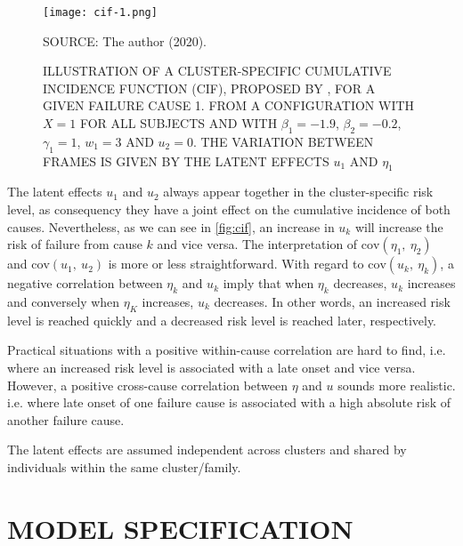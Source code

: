 \begin{figure}[H]
  \setlength{\abovecaptionskip}{.0001pt}
  \caption{ILLUSTRATION OF A CLUSTER-SPECIFIC CUMULATIVE INCIDENCE
    FUNCTION (CIF), PROPOSED BY , FOR A GIVEN
    FAILURE CAUSE 1. FROM A CONFIGURATION WITH \(X = 1\) FOR ALL
    SUBJECTS AND WITH \(\beta_{1} = -1.9\), \(\beta_{2} = -0.2\),
    \(\gamma_{1} = 1\), \(w_{1} = 3\) AND \(u_{2} = 0\). THE VARIATION
    BETWEEN FRAMES IS GIVEN BY THE LATENT EFFECTS \(u_{1}\) AND
    \(\eta_{1}\)}
  \vspace{0.425cm} \centering
  \texttt{[image: cif-1.png]}
  \\
  \vspace{0.45cm}
  \begin{footnotesize}
    SOURCE: The author (2020).
  \end{footnotesize}
  \label{fig:cif}
\end{figure}

The latent effects \(u_{1}\) and \(u_{2}\) always appear together in the
cluster-specific risk level, as consequency they have a joint effect on
the cumulative incidence of both causes. Nevertheless, as we can see in
\autoref{fig:cif}, an increase in \(u_{k}\) will increase the risk of
failure from cause \(k\) and vice versa. The interpretation of
\(\text{cov}(\eta_{1},~\eta_{2})\) and \(\text{cov}(u_{1},~u_{2})\) is
more or less straightforward. With regard to
\(\text{cov}(u_{k},~\eta_{k})\), a negative correlation between
\(\eta_{k}\) and \(u_{k}\) imply that when \(\eta_{k}\) decreases,
\(u_{k}\) increases and conversely when \(\eta_{K}\) increases,
\(u_{k}\) decreases. In other words, an increased risk level is reached
quickly and a decreased risk level is reached later, respectively.

Practical situations with a positive within-cause correlation are hard
to find, i.e. where an increased risk level is associated with a late
onset and vice versa. However, a positive cross-cause correlation
between \(\eta\) and \(u\) sounds more realistic. i.e. where late onset
of one failure cause is associated with a high absolute risk of another
failure cause.

The latent effects are assumed independent across clusters and shared by
individuals within the same cluster/family.

\section{MODEL SPECIFICATION}
\label{cap:modelitself}

